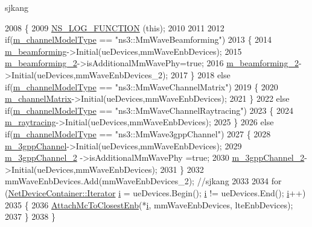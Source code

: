 sjkang 
\begin{DoxyCode}
2008 \{
2009         \hyperlink{log-macros-disabled_8h_a90b90d5bad1f39cb1b64923ea94c0761}{NS\_LOG\_FUNCTION} (\textcolor{keyword}{this});
2010 
2011 
2012         \textcolor{keywordflow}{if}(\hyperlink{classns3_1_1MmWaveHelper_aec88d691230f0db9448a7f953301bb24}{m\_channelModelType} == \textcolor{stringliteral}{"ns3::MmWaveBeamforming"})
2013         \{
2014                 \hyperlink{classns3_1_1MmWaveHelper_a4fa071b6d755f32a684906150660b381}{m\_beamforming}->Initial(ueDevices,mmWaveEnbDevices); 
2015                 \hyperlink{classns3_1_1MmWaveHelper_a3406a28781481686589a5275787bf43f}{m\_beamforming\_2}->isAdditionalMmWavePhy=\textcolor{keyword}{true};
2016                 \hyperlink{classns3_1_1MmWaveHelper_a3406a28781481686589a5275787bf43f}{m\_beamforming\_2}->Initial(ueDevices,mmWaveEnbDevices\_2); 
2017         \}
2018         \textcolor{keywordflow}{else} \textcolor{keywordflow}{if}(\hyperlink{classns3_1_1MmWaveHelper_aec88d691230f0db9448a7f953301bb24}{m\_channelModelType} == \textcolor{stringliteral}{"ns3::MmWaveChannelMatrix"})
2019         \{
2020                 \hyperlink{classns3_1_1MmWaveHelper_a731a9e28a12edacd78b96800025db070}{m\_channelMatrix}->Initial(ueDevices,mmWaveEnbDevices);
2021         \}
2022         \textcolor{keywordflow}{else} \textcolor{keywordflow}{if}(\hyperlink{classns3_1_1MmWaveHelper_aec88d691230f0db9448a7f953301bb24}{m\_channelModelType} == \textcolor{stringliteral}{"ns3::MmWaveChannelRaytracing"})
2023         \{
2024                 \hyperlink{classns3_1_1MmWaveHelper_a99e1ebbb84d122ea60a9fe7c1bb44528}{m\_raytracing}->Initial(ueDevices,mmWaveEnbDevices);
2025         \}
2026         \textcolor{keywordflow}{else} \textcolor{keywordflow}{if}(\hyperlink{classns3_1_1MmWaveHelper_aec88d691230f0db9448a7f953301bb24}{m\_channelModelType} == \textcolor{stringliteral}{"ns3::MmWave3gppChannel"})
2027         \{
2028                 \hyperlink{classns3_1_1MmWaveHelper_a1cbb083568aa048da48260725e3cf4a4}{m\_3gppChannel}->Initial(ueDevices,mmWaveEnbDevices);
2029                 \hyperlink{classns3_1_1MmWaveHelper_a708ff94e1399ab339e634dc7d4a5b44d}{m\_3gppChannel\_2} ->isAdditionalMmWavePhy =\textcolor{keyword}{true};
2030                 \hyperlink{classns3_1_1MmWaveHelper_a708ff94e1399ab339e634dc7d4a5b44d}{m\_3gppChannel\_2}->Initial(ueDevices,mmWaveEnbDevices);
2031         \}
2032         mmWaveEnbDevices.Add(mmWaveEnbDevices\_2); \textcolor{comment}{//sjkang}
2033 
2034         \textcolor{keywordflow}{for} (\hyperlink{classns3_1_1NetDeviceContainer_a45709bb572f975569ed985fa89b132f8}{NetDeviceContainer::Iterator} \hyperlink{bernuolliDistribution_8m_a6f6ccfcf58b31cb6412107d9d5281426}{i} = ueDevices.Begin(); 
      \hyperlink{bernuolliDistribution_8m_a6f6ccfcf58b31cb6412107d9d5281426}{i} != ueDevices.End(); \hyperlink{bernuolliDistribution_8m_a6f6ccfcf58b31cb6412107d9d5281426}{i}++)
2035         \{
2036                 \hyperlink{classns3_1_1MmWaveHelper_ab071490fd7b33a01933e274fa2a29415}{AttachMcToClosestEnb}(*\hyperlink{bernuolliDistribution_8m_a6f6ccfcf58b31cb6412107d9d5281426}{i}, mmWaveEnbDevices, lteEnbDevices);
2037         \}
2038 \}
\end{DoxyCode}


